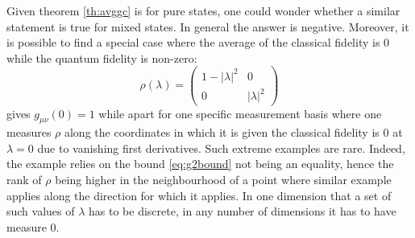 \documentclass[
  american,aps,pra,reprint,floatfix,nofootinbib,superscriptaddress
]{revtex4-2}
\newcommand{\abs}[1]{\left|#1\right|}
\begin{document}
Given theorem \ref{th:avggc} is for pure states, one could wonder
whether a similar statement is true for mixed states. In general the answer
is negative. Moreover, it is possible to find a special case where
the average of the classical fidelity is 0 while the quantum fidelity
is non-zero:
\begin{equation}
  \rho(\lambda) =
    \begin{pmatrix}
      1 - \abs{\lambda}^2 & 0 \\
      0 & \abs{\lambda}^2
    \end{pmatrix}
\end{equation}
gives $g_{\mu\nu}(0) = 1$ while apart for one specific measurement basis where
one measures $\rho$ along the coordinates in which it is given
the classical fidelity is $0$ at $\lambda=0$ due to vanishing first derivatives.
Such extreme examples are rare. Indeed, the example relies on the bound
\eqref{eq:g2bound} not being an equality, hence the rank of $\rho$
being higher in the neighbourhood of a point where similar example applies
along the direction for which it applies. In one dimension that
a set of such values of $\lambda$ has to be discrete, in any number of
dimensions it has to have measure $0$.
\end{document}
